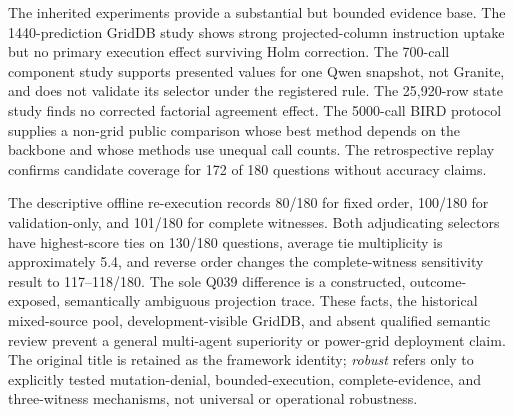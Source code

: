 \documentclass[applsci,article,submit,moreauthors]{Definitions/mdpi}
\begin{document}
The inherited experiments provide a substantial but bounded evidence base. The 1440-prediction GridDB study shows strong projected-column instruction uptake but no primary execution effect surviving Holm correction. The 700-call component study supports presented values for one Qwen snapshot, not Granite, and does not validate its selector under the registered rule. The 25,920-row state study finds no corrected factorial agreement effect. The 5000-call BIRD protocol supplies a non-grid public comparison whose best method depends on the backbone and whose methods use unequal call counts. The retrospective replay confirms candidate coverage for 172 of 180 questions without accuracy claims.

The descriptive offline re-execution records 80/180 for fixed order, 100/180 for validation-only, and 101/180 for complete witnesses. Both adjudicating selectors have highest-score ties on 130/180 questions, average tie multiplicity is approximately 5.4, and reverse order changes the complete-witness sensitivity result to 117--118/180. The sole Q039 difference is a constructed, outcome-exposed, semantically ambiguous projection trace. These facts, the historical mixed-source pool, development-visible GridDB, and absent qualified semantic review prevent a general multi-agent superiority or power-grid deployment claim. The original title is retained as the framework identity; \emph{robust} refers only to explicitly tested mutation-denial, bounded-execution, complete-evidence, and three-witness mechanisms, not universal or operational robustness.
\end{document}
